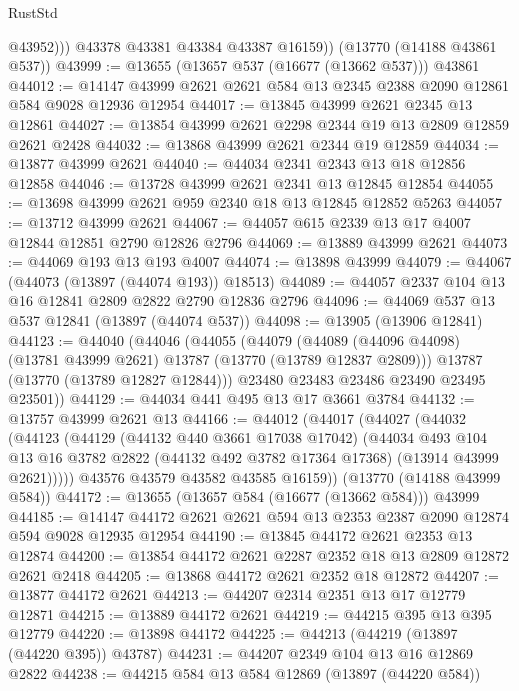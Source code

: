 \begin{lexlean}{RustStd}
\begin{coremodule}
              @43952)))
        @43378
        @43381
        @43384
        @43387
        @16159))
    (@13770 (@14188 @43861 @537))
@43999 := @13655 (@13657 @537 (@16677 (@13662 @537))) @43861
@44012 := @14147 @43999 @2621 @2621 @584 @13 @2345 @2388 @2090 @12861 @584 @9028 @12936 @12954
@44017 := @13845 @43999 @2621 @2345 @13 @12861
@44027 := @13854 @43999 @2621 @2298 @2344 @19 @13 @2809 @12859 @2621 @2428
@44032 := @13868 @43999 @2621 @2344 @19 @12859
@44034 := @13877 @43999 @2621
@44040 := @44034 @2341 @2343 @13 @18 @12856 @12858
@44046 := @13728 @43999 @2621 @2341 @13 @12845 @12854
@44055 := @13698 @43999 @2621 @959 @2340 @18 @13 @12845 @12852 @5263
@44057 := @13712 @43999 @2621
@44067 := @44057 @615 @2339 @13 @17 @4007 @12844 @12851 @2790 @12826 @2796
@44069 := @13889 @43999 @2621
@44073 := @44069 @193 @13 @193 @4007
@44074 := @13898 @43999
@44079 := @44067 (@44073 (@13897 (@44074 @193)) @18513)
@44089 := @44057 @2337 @104 @13 @16 @12841 @2809 @2822 @2790 @12836 @2796
@44096 := @44069 @537 @13 @537 @12841 (@13897 (@44074 @537))
@44098 := @13905 (@13906 @12841)
@44123 := @44040
    (@44046
      (@44055
        (@44079
          (@44089 (@44096 @44098) (@13781 @43999 @2621) @13787 (@13770 (@13789 @12837 @2809)))
          @13787
          (@13770 (@13789 @12827 @12844)))
        @23480
        @23483
        @23486
        @23490
        @23495
        @23501))
@44129 := @44034 @441 @495 @13 @17 @3661 @3784
@44132 := @13757 @43999 @2621 @13
@44166 := @44012
    (@44017
      (@44027
        (@44032
          (@44123
            (@44129
              (@44132 @440 @3661 @17038 @17042)
              (@44034
                @493
                @104
                @13
                @16
                @3782
                @2822
                (@44132 @492 @3782 @17364 @17368)
                (@13914 @43999 @2621)))))
        @43576
        @43579
        @43582
        @43585
        @16159))
    (@13770 (@14188 @43999 @584))
@44172 := @13655 (@13657 @584 (@16677 (@13662 @584))) @43999
@44185 := @14147 @44172 @2621 @2621 @594 @13 @2353 @2387 @2090 @12874 @594 @9028 @12935 @12954
@44190 := @13845 @44172 @2621 @2353 @13 @12874
@44200 := @13854 @44172 @2621 @2287 @2352 @18 @13 @2809 @12872 @2621 @2418
@44205 := @13868 @44172 @2621 @2352 @18 @12872
@44207 := @13877 @44172 @2621
@44213 := @44207 @2314 @2351 @13 @17 @12779 @12871
@44215 := @13889 @44172 @2621
@44219 := @44215 @395 @13 @395 @12779
@44220 := @13898 @44172
@44225 := @44213 (@44219 (@13897 (@44220 @395)) @43787)
@44231 := @44207 @2349 @104 @13 @16 @12869 @2822
@44238 := @44215 @584 @13 @584 @12869 (@13897 (@44220 @584))

\end{coremodule}
\end{lexlean}

